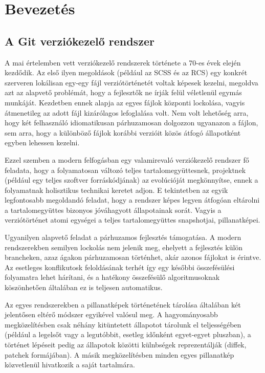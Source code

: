 \documentclass[
]{elteikthesis}[2025/03/25]
\begin{document}
\tableofcontents
\cleardoublepage

\chapter{Bevezetés}

\section{A Git verziókezelő rendszer}

A mai értelemben vett verziókezelő rendszerek története a 70-es évek elején kezdődik.
Az első ilyen megoldások (például az SCSS és az RCS) egy konkrét szerveren lokálisan
egy-egy fájl verziótörténetét voltak képesek kezelni,
megoldva azt az alapvető problémát, hogy a fejlesztők ne írják felül véletlenül egymás munkáját.
Kezdetben ennek alapja az egyes fájlok központi lockolása, vagyis átmenetileg az adott fájl kizárólagos lefoglalása volt.
Nem volt lehetőség arra, hogy két felhasználó idiomatikusan párhuzamosan dolgozzon ugyanazon a fájlon,
sem arra, hogy a különböző fájlok korábbi verzióit közös átfogó állapotként egyben lehessen kezelni.

Ezzel szemben a modern felfogásban egy valamirevaló verziókezelő rendszer fő feladata,
hogy a folyamatosan változó teljes tartalomegyüttesnek, projektnek (például egy teljes szoftver forráskódjának)
az evolúcióját megkönnyítse, ennek a folyamatnak holisztikus technikai keretet adjon.
E tekintetben az egyik legfontosabb megoldandó feladat,
hogy a rendszer képes legyen átfogóan eltárolni a tartalomegyüttes bizonyos jóváhagyott állapotainak sorát.
Vagyis a verziótörténet atomi egységei
a teljes tartalomegyüttes snapshotjai, pillanatképei.

Ugyanilyen alapvető feladat a párhuzamos fejlesztés támogatása.
A modern rendszerekben semilyen lockolás nem jelenik meg,
ehelyett a fejlesztés külön brancheken, azaz ágakon párhuzamosan történhet, akár azonos fájlokat is érintve.
Az esetleges konflikutosk feloldásának terhét így egy későbbi összefésülési folyamatra lehet hárítani,
és a hatékony összefésülő algoritmusoknak köszönhetően általában ez is teljesen automatikus.

Az egyes rendszerekben a pillanatképek történetének tárolása általában két jelentősen eltérő módszer egyikével valósul meg.
A hagyományosabb megközelítésben csak néhány kitüntetett állapotot tárolunk el teljességében
(például a legelsőt vagy a legutóbbit, esetleg időnként egyet-egyet pluszban),
a történet lépéseit pedig az állapotok közötti külnbségek reprezentálják (diffek, patchek formájában).
A másik megközelítésben minden egyes pillanatkép közvetlenül hivatkozik a saját tartalmára.
\end{document}
